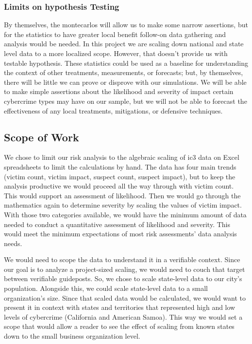 \subsubsection{Limits on \Gls{hypothesis} Testing}
By themselves, the \gls{montecarlo}s will allow us to make some narrow assertions, but for the \gls{statistics} to have greater local benefit follow-on data gathering and analysis would be needed.  In this project we are scaling down national and state level data to a more localized scope.  However, that doesn't provide us with testable \gls{hypothesis}.  These statistics could be used as a baseline for understanding the context of other treatments, measurements, or forecasts; but, by themselves, there will be little we can prove or disprove with our simulations.  We will be able to make simple assertions about the likelihood and severity of impact certain \gls{cybercrime} types may have on our \gls{sample}, but we will not be able to forecast the effectiveness of any local treatments, mitigations, or defensive techniques.

\subsection{Scope of Work}
We chose to limit our risk analysis to the algebraic scaling of \gls{ic3} data on Excel spreadsheets to limit the calculations by hand.  The data has four main trends (victim count, victim impact, suspect count, suspect impact), but to keep the analysis productive we would proceed all the way through with victim count.  This would support an assessment of likelihood.  Then we would go through the mathematics again to determine severity by scaling the values of victim impact.  With those two categories available, we would have the minimum amount of data needed to conduct a quantitative assessment of likelihood and severity.  This would meet the minimum expectations of most risk assessments' data analysis needs.

We would need to scope the data to understand it in a verifiable context.  Since our goal is to analyze a project-sized scaling, we would need to couch that target between verifiable guideposts.  So, we chose to scale state-level data to our city's  \gls{population}.  Alongside this, we could scale state-level data to a small organization's size.  Since that scaled data would be calculated, we would want to present it in context with states and territories that represented high and low levels of  \gls{cybercrime} (California and  American Samoa).  This way we would set a scope that would allow a reader to see the effect of scaling from known states down to the small business organization level.
